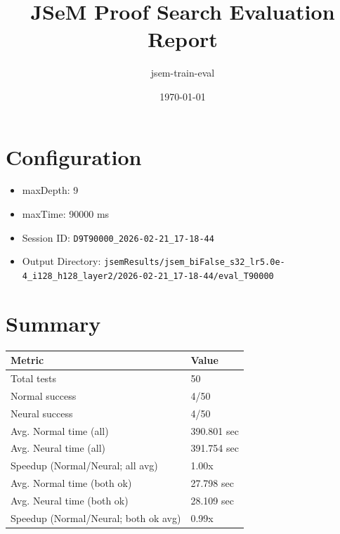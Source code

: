 \documentclass[a4paper,10pt]{article}
\title{JSeM Proof Search Evaluation Report}
\author{jsem-train-eval}
\date{\today}
\begin{document}
\maketitle

\section{Configuration}
\begin{itemize}
\item maxDepth: 9
\item maxTime: 90000 ms
\item Session ID: \texttt{D9T90000\_2026-02-21\_17-18-44}
\item Output Directory: \texttt{jsemResults/jsem\_biFalse\_s32\_lr5.0e-4\_i128\_h128\_layer2/2026-02-21\_17-18-44/eval\_T90000}
\end{itemize}

\section{Summary}
\begin{tabular}{ll}
\toprule
\textbf{Metric} & \textbf{Value} \\
\midrule
Total tests & 50 \\
Normal success & 4/50 \\
Neural success & 4/50 \\
\midrule
Avg. Normal time (all) & 390.801 sec \\
Avg. Neural time (all) & 391.754 sec \\
Speedup (Normal/Neural; all avg) & 1.00x \\
Avg. Normal time (both ok) & 27.798 sec \\
Avg. Neural time (both ok) & 28.109 sec \\
Speedup (Normal/Neural; both ok avg) & 0.99x \\
\bottomrule
\end{tabular}
\end{document}
